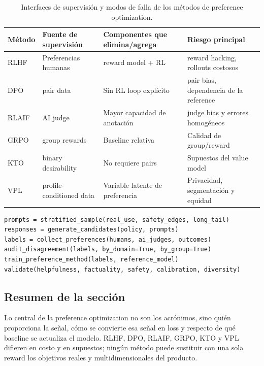 \begin{table}[H]
\centering
\small
\begin{tabularx}{\textwidth}{L{0.13\textwidth} L{0.20\textwidth} X X}
\toprule
Método & Fuente de supervisión & Componentes que elimina/agrega & Riesgo principal \\
\midrule
RLHF & Preferencias humanas & reward model + RL & reward hacking, rollouts costosos \\
DPO & pair data & Sin RL loop explícito & pair bias, dependencia de la reference \\
RLAIF & AI judge & Mayor capacidad de anotación & judge bias y errores homogéneos \\
GRPO & group rewards & Baseline relativa & Calidad de group/reward \\
KTO & binary desirability & No requiere pairs & Supuestos del value model \\
VPL & profile-conditioned data & Variable latente de preferencia & Privacidad, segmentación y equidad \\
\bottomrule
\end{tabularx}
\caption{Interfaces de supervisión y modos de falla de los métodos de preference optimization.}
\end{table}

\begin{lstlisting}[caption={Esqueleto mínimo de auditoría de un pipeline de preference data}]
prompts = stratified_sample(real_use, safety_edges, long_tail)
responses = generate_candidates(policy, prompts)
labels = collect_preferences(humans, ai_judges, outcomes)
audit_disagreement(labels, by_domain=True, by_group=True)
train_preference_method(labels, reference_model)
validate(helpfulness, factuality, safety, calibration, diversity)
\end{lstlisting}

\subsection{Resumen de la sección}

Lo central de la preference optimization no son los acrónimos, sino quién proporciona la señal, cómo se convierte esa señal en loss y respecto de qué baseline se actualiza el modelo. RLHF, DPO, RLAIF, GRPO, KTO y VPL difieren en costo y en supuestos; ningún método puede sustituir con una sola reward los objetivos reales y multidimensionales del producto.
